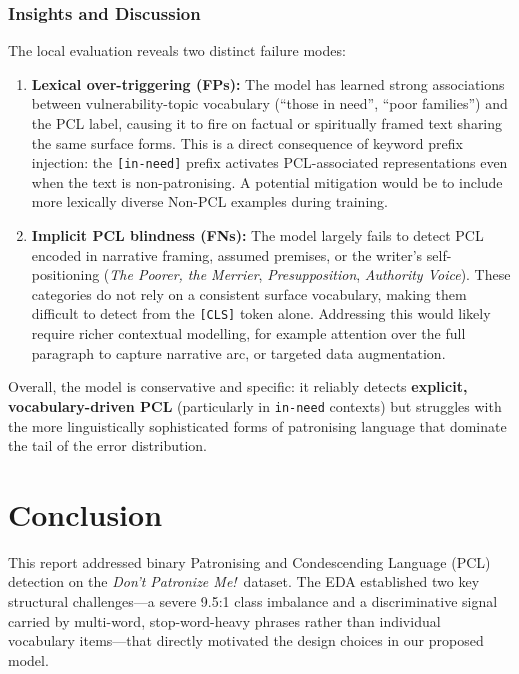 \documentclass[11pt,a4paper]{article}
\begin{document}
\subsubsection{Insights and Discussion}

The local evaluation reveals two distinct failure modes:

\begin{enumerate}[noitemsep]
    \item \textbf{Lexical over-triggering (FPs):} The model has learned strong associations between vulnerability-topic vocabulary (``those in need'', ``poor families'') and the PCL label, causing it to fire on factual or spiritually framed text sharing the same surface forms. This is a direct consequence of keyword prefix injection: the {\texttt{[in-need]}} prefix activates PCL-associated representations even when the text is non-patronising. A potential mitigation would be to include more lexically diverse Non-PCL examples during training.
    \item \textbf{Implicit PCL blindness (FNs):} The model largely fails to detect PCL encoded in narrative framing, assumed premises, or the writer's self-positioning (\textit{The Poorer, the Merrier}, \textit{Presupposition}, \textit{Authority Voice}). These categories do not rely on a consistent surface vocabulary, making them difficult to detect from the {\texttt{[CLS]}} token alone. Addressing this would likely require richer contextual modelling, for example attention over the full paragraph to capture narrative arc, or targeted data augmentation.
\end{enumerate}

Overall, the model is conservative and specific: it reliably detects \textbf{explicit, vocabulary-driven PCL} (particularly in \texttt{in-need} contexts) but struggles with the more linguistically sophisticated forms of patronising language that dominate the tail of the error distribution.

\newpage
\section{Conclusion}

This report addressed binary Patronising and Condescending Language (PCL) detection on the \textit{Don't Patronize Me!}\ dataset. The EDA established two key structural challenges---a severe 9.5:1 class imbalance and a discriminative signal carried by multi-word, stop-word-heavy phrases rather than individual vocabulary items---that directly motivated the design choices in our proposed model.
\end{document}

